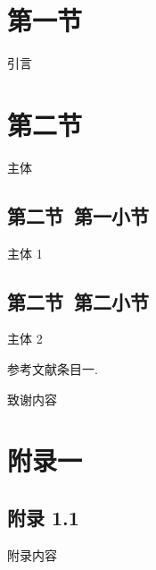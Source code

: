 \documentclass{NJUbachelor}
\begin{document}
\makectitlepage

\begin{cabstract}
\end{cabstract}

\begin{eabstract}
\end{eabstract}

\thispagestyle{plain} %
\vspace*{0em}
\tableofcontents

\newpage
{}

\thispagestyle{plain} %
\makectitle

\section{第一节}

引言

\section{第二节}

主体

\subsection{第二节~第一小节}

主体 1

\subsection{第二节~第二小节}

主体 2


\newpage
{}

\begin{thebibliography}{99}
 参考文献条目一.
\end{thebibliography}

\newpage
\ack

致谢内容

\newpage
\appendix

\section{附录一}

\subsection{附录 1.1}

附录内容
\end{document}
